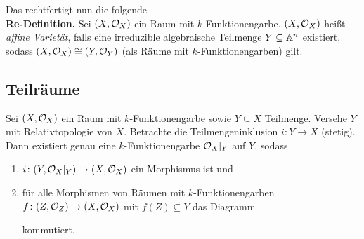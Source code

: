 \documentclass[12pt,a4paper]{scrartcl}
\theoremstyle{cplain}
\theoremstyle{cdef}
\begin{document}
Das rechtfertigt nun die folgende\\
\textbf{Re-Definition.} Sei $(X,\mathcal{O}_X)$ ein Raum mit $k$-Funktionengarbe. $(X,\mathcal{O}_X)$ heißt \emph{affine Varietät}, falls eine irreduzible algebraische Teilmenge $Y\subseteq \mathbb A^n$ existiert, sodass $(X,\mathcal{O}_X)\cong (Y,\mathcal{O}_Y)$ (als Räume mit $k$-Funktionengarben) gilt.


\subsection{Teilräume}
\begin{lem} \label{lem:10.11}
	Sei $(X,\mathcal{O}_X)$ ein Raum mit $k$-Funktionengarbe sowie $Y\subseteq X$ Teilmenge. Versehe $Y$ mit Relativtopologie von $X$. Betrachte die Teilmengeninklusion $i\colon Y\to X$ (stetig). Dann existiert genau eine $k$-Funktionengarbe $\mathcal{O}_X|_Y$ auf $Y$, sodass
	\begin{enumerate}
		\item \label{lem:10.11:i} $i\colon (Y,\mathcal{O}_X|_Y)\to (X,\mathcal{O}_X)$ ein Morphismus ist und
		\item \label{lem:10.11:ii} für alle Morphismen von Räumen mit $k$-Funktionengarben $f\colon (Z,\mathcal{O}_Z)\to (X,\mathcal{O}_X)$ mit $f(Z)\subseteq Y$ das Diagramm
		\begin{center}
		\end{center}
		kommutiert.
	\end{enumerate}
\end{lem}
\end{document}
